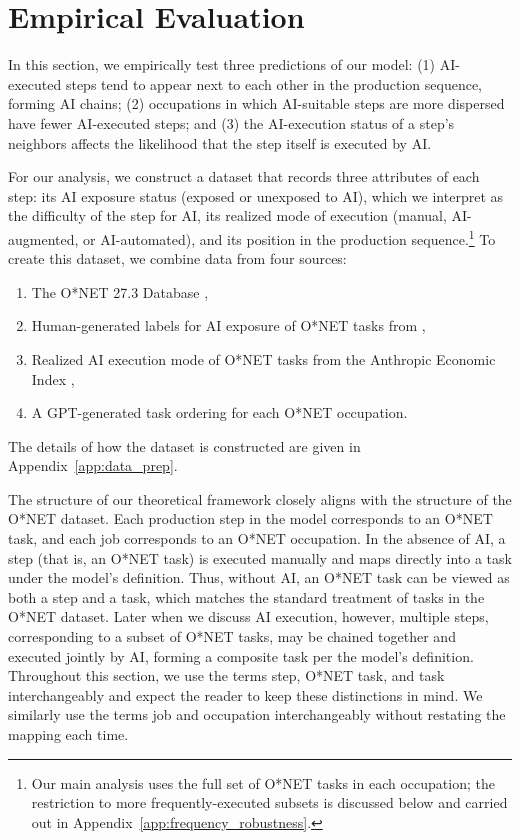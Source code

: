 \section{Empirical Evaluation}
\label{sec:empirics}

In this section, we empirically test three predictions of our model: (1) AI-executed steps tend to appear next to each other in the production sequence, forming AI chains; (2) occupations in which AI-suitable steps are more dispersed have fewer AI-executed steps; and (3) the AI-execution status of a step's neighbors affects the likelihood that the step itself is executed by AI.

For our analysis, we construct a dataset that records three attributes of each step: its AI exposure status (exposed or unexposed to AI), which we interpret as the difficulty of the step for AI, its realized mode of execution (manual, AI-augmented, or AI-automated), and its position in the production sequence.\footnote{
Our main analysis uses the full set of O*NET tasks in each occupation; the restriction to more frequently-executed subsets is discussed below and carried out in Appendix~\ref{app:frequency_robustness}.
}
To create this dataset, we combine data from four sources:
\begin{enumerate}
    \item The O*NET 27.3 Database \citep{onet27_3},
    \item Human-generated labels for AI exposure of O*NET tasks from \cite{eloundou2023gpts},
    \item Realized AI execution mode of O*NET tasks from the Anthropic Economic Index \citep{handa2025economictasksperformedai},
    \item A GPT-generated task ordering for each O*NET occupation.
\end{enumerate}
The details of how the dataset is constructed are given in Appendix~\ref{app:data_prep}.

The structure of our theoretical framework closely aligns with the structure of the O*NET dataset.
Each production step in the model corresponds to an O*NET task, and each job corresponds to an O*NET occupation.
In the absence of AI, a step (that is, an O*NET task) is executed manually and maps directly into a task under the model's definition.
Thus, without AI, an O*NET task can be viewed as both a step and a task, which matches the standard treatment of tasks in the O*NET dataset.
Later when we discuss AI execution, however, multiple steps, corresponding to a subset of O*NET tasks, may be chained together and executed jointly by AI, forming a composite task per the model's definition.
Throughout this section, we use the terms step, O*NET task, and task interchangeably and expect the reader to keep these distinctions in mind.
We similarly use the terms job and occupation interchangeably without restating the mapping each time.

